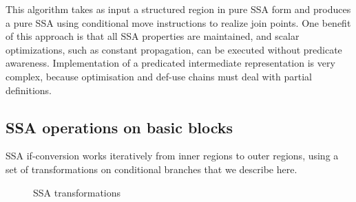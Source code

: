 This algorithm takes as input a structured region in pure SSA form and produces a pure SSA using conditional move instructions to realize join points. One benefit of this approach is that all SSA properties are maintained, and scalar optimizations, such as constant propagation, can be executed without predicate awareness. Implementation of a predicated intermediate representation is very complex, because optimisation and def-use chains must deal with partial definitions.

\subsection{SSA operations on basic blocks}

SSA if-conversion works iteratively from inner regions to outer regions, using a set of transformations on conditional branches that we describe here.

\begin{figure}[h]
\centering

\caption{SSA transformations}
\label{fig: phi_operations}
\end{figure}

